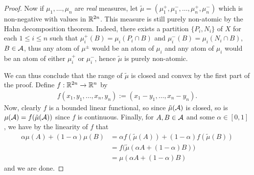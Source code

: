\begin{proof}
Now if $\mu_{1}, \dots, \mu_{n}$ are \emph{real} measures, let $\tilde{\mu}=(\mu_{1}^{+}, \mu_{1}^{-}, \dots, \mu_{n}^{+}, \mu_{n}^{-})$ which is non-negative with values in $\mathbb{R}^{2n}$. This measure is still purely non-atomic by the Hahn decomposition theorem. Indeed, there exists a partition $\{P_{i}, N_{i}\}$ of $X$ for each $1\le i \le n$ such that $\mu_{i}^{+}(B)=\mu_{i}(P_{i}\cap B)$ and $\mu_{i}^{-}(B)=\mu_{i}(N_{i} \cap B)$, $B\in \mathcal{A}$, thus any atom of $\mu^{\pm}$ would be an atom of $\mu_{i}$ and any atom of $\mu_{i}$ would be an atom of either $\mu_{i}^{+}$ or $\mu_{i}^{-}$, hence $\tilde{\mu}$ is purely non-atomic. 

We can thus conclude that the range of $\tilde{\mu}$ is closed and convex by the first part of the proof. Define $f:\mathbb{R}^{2n} \to \mathbb{R}^{n}$ by
\begin{align*}
	f(x_{1}, y_{1}, \dots, x_{n}, y_{n}):=(x_{1}-y_{1}, \dots, x_{n}-y_{n}).
\end{align*}
Now, clearly $f$ is a bounded linear functional, so since $\tilde{\mu}(\mathcal{A})$ is closed, so is $\mu(\mathcal{A})=f(\tilde{\mu}(\mathcal{A}))$ since $f$ is continuous. Finally, for $A,B\in \mathcal{A}$ and some $\alpha\in [0,1]$, we have by the linearity of $f$ that
\begin{align*}
	\alpha \mu(A)+(1-\alpha)\mu(B)&=\alpha f(\tilde{\mu}(A))+(1-\alpha)f(\tilde{\mu}(B)) \\
	&=f\Big( \tilde{\mu}(\alpha A+(1-\alpha) B)\Big) \\
	&=\mu(\alpha A + (1-\alpha) B)
\end{align*}
and we are done.
\end{proof}


